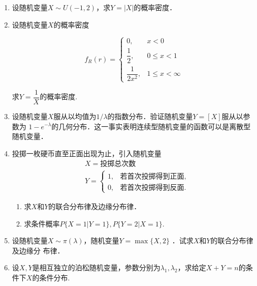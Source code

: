 \documentclass[10pt,a4paper]{article}
\begin{document}
\begin{enumerate}
    \item 设随机变量$X\sim U(-1,2)$，求$Y=|X|$的概率密度．
    \clearpage


    \item 设随机变量$X$的概率密度

    \vspace{-0.5cm}
    \begin{spacing}{2}
    $$f_R(r)=\left\{\begin{array}{ll}
        0, & x<0\\
        \dfrac{1}{2}, & 0\leq x <1\\
        \dfrac{1}{2x^2}, & 1\leq x <\infty
    \end{array}\right.$$
    \end{spacing}
    求$Y=\dfrac{1}{X}$的概率密度.
    \clearpage


    \item 设随机变量$X$服从以均值为$1/\lambda$的指数分布．验证随机变量$Y=[X]$服从以参数为
    $1-e^{-\lambda}$的几何分布．这一事实表明连续型随机变量的函数可以是离散型随机变量．
    \clearpage




    \item 投掷一枚硬币直至正面出现为止，引入随机变量
    \begin{equation}
        \begin{split}
            &X=\mbox{投掷总次数}\\
            &Y=\left\{\begin{array}{ll}
                1, & \mbox{若首次投掷得到正面},\\
                0, & \mbox{若首次投掷得到反面}.
            \end{array}\right.
        \end{split}
        \nonumber
    \end{equation}
    \begin{enumerate}
        \item 求$X$和$Y$的联合分布律及边缘分布律．
        \item 求条件概率$P\{X=1|Y=1\},P\{Y=2|X=1\}$.
    \end{enumerate}
    \clearpage


    
    \item 设随机变量$X\sim \pi(\lambda)$，随机变量$Y=\max\{X,2\}$ ．试求$X$和$Y$的联合分布律及边缘分
    布律．
    \clearpage



    \item 设$X,Y$是相互独立的泊松随机变量，参数分别为$\lambda_1,\lambda_2$，求给定$X+Y=n$的条件下$X$的条件分布.
    \clearpage





\end{enumerate}
\end{document}
